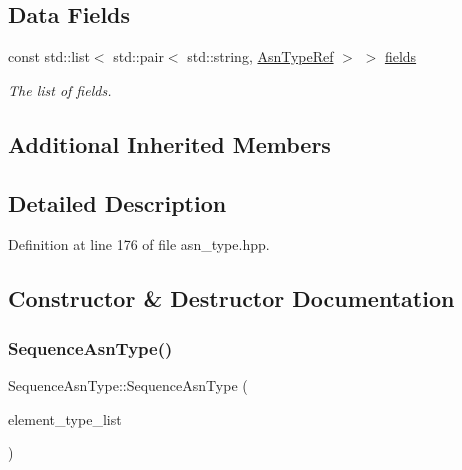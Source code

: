 \subsection*{Data Fields}
\begin{DoxyCompactItemize}
\item 
const std\+::list$<$ std\+::pair$<$ std\+::string, \hyperlink{asn__type_8hpp_a456d7cf50c15d087cc0428ae80834b35}{Asn\+Type\+Ref} $>$ $>$ \hyperlink{classSequenceAsnType_a622d1d34bc965558712d7c75bebe8ddf}{fields}
\begin{DoxyCompactList}\small\item\em The list of fields. \end{DoxyCompactList}\end{DoxyCompactItemize}
\subsection*{Additional Inherited Members}


\subsection{Detailed Description}


Definition at line 176 of file asn\+\_\+type.\+hpp.



\subsection{Constructor \& Destructor Documentation}
\mbox{\label{classSequenceAsnType_a8d98a4d00f2a56565fb2a11100fe08c7}} 
\subsubsection{\texorpdfstring{Sequence\+Asn\+Type()}{SequenceAsnType()}}
{\footnotesize\ttfamily Sequence\+Asn\+Type\+::\+Sequence\+Asn\+Type (\begin{DoxyParamCaption}\item[{std\+::list$<$ std\+::pair$<$ std\+::string, \hyperlink{asn__type_8hpp_a456d7cf50c15d087cc0428ae80834b35}{Asn\+Type\+Ref} $>$$>$}]{element\+\_\+type\+\_\+list }\end{DoxyParamCaption})\hspace{0.3cm}{\ttfamily [explicit]}}



